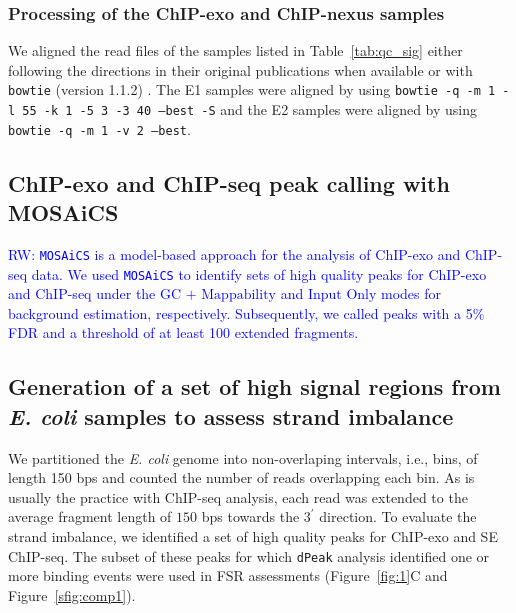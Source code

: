 \documentclass{bmcart}
\newcommand{\SK}[1]{\textcolor{red}{SK: #1}}
\newcommand{\RW}[1]{\textcolor{blue}{RW: #1}}
\newcommand{\sig}{\sigma^{70}}
\begin{document}
\subsubsection*{Processing of the ChIP-exo and ChIP-nexus samples}

We aligned the read files of the samples listed in
Table~\ref{tab:qc_sig} either following the directions in their
original publications when available or with \texttt{bowtie} (version
1.1.2) \cite{bowtie}. The E1 samples were aligned by using
\texttt{bowtie -q -m 1 -l 55 -k 1 -5 3 -3 40 --best -S} and the E2
samples were aligned by using \texttt{bowtie -q -m 1 -v 2 --best}.



\subsection*{ChIP-exo and ChIP-seq peak calling with MOSAiCS}

\RW{ \texttt{MOSAiCS} \cite{mosaics} is a model-based approach for the
  analysis of ChIP-exo and ChIP-seq data. We used \texttt{MOSAiCS} to
  identify sets of high quality peaks for ChIP-exo and ChIP-seq under
  the $\mbox{GC + Mappability}$ and $\mbox{Input Only}$ modes for
  background estimation, respectively. Subsequently, we called peaks
  with a 5\% FDR and a threshold of at least 100 extended fragments.}

\subsection*{Generation of a set of high signal regions from
  \textit{E. coli} samples to assess strand imbalance}


We partitioned the \textit{E. coli} genome into non-overlaping
intervals, i.e., bins, of length 150 bps and counted the number of
reads overlapping each bin. As is usually the practice with ChIP-seq
analysis, each read was extended to the average fragment length of
$150$ bps towards the $3^{\prime}$ direction. To evaluate the strand
imbalance, we identified a set of high quality peaks for ChIP-exo and
SE ChIP-seq. The subset of these peaks for which \texttt{dPeak}
analysis identified one or more binding events were used in FSR
assessments (Figure~\ref{fig:1}C and Figure~\ref{sfig:comp1}).
\end{document}
